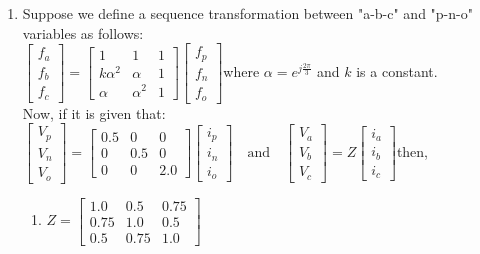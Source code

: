 \documentclass[journal]{IEEEtran}
\numberwithin{equation}{enumi}
\numberwithin{figure}{enumi}
\begin{document}
\begin{enumerate}
\begin{multicols}{4}
\begin{enumerate}
\end{enumerate}
\end{multicols}
    \bigskip
    \item Suppose we define a sequence transformation between "a-b-c" and "p-n-o" variables as follows:\\$\begin{bmatrix}f_a \\f_b \\f_c\end{bmatrix}=\begin{bmatrix}1 & 1 & 1 \\k\alpha^2 & \alpha & 1 \\\alpha & \alpha^2 & 1\end{bmatrix}\begin{bmatrix}f_p \\f_n \\f_o\end{bmatrix}$where $ \alpha = e^{j\frac{2\pi}{3}} $ and $ k $ is a constant.\\Now, if it is given that:$\begin{bmatrix}V_p \\V_n \\V_o\end{bmatrix}=\begin{bmatrix}
    0.5 & 0 & 0 \\
    0 & 0.5 & 0 \\
    0 & 0 & 2.0
    \end{bmatrix}\begin{bmatrix}i_p \\i_n \\i_o\end{bmatrix}\quad \text{and} \quad\begin{bmatrix}V_a \\V_b \\V_c\end{bmatrix}= Z\begin{bmatrix}i_a \\i_b \\i_c\end{bmatrix}$then,
    \begin{multicols}{2}
    \begin{enumerate}
        \item $ Z = \begin{bmatrix} 1.0 & 0.5 & 0.75 \\ 0.75 & 1.0 & 0.5 \\ 0.5 & 0.75 & 1.0 \end{bmatrix} $

\end{enumerate}
\end{multicols}
\end{enumerate}
\end{document}
